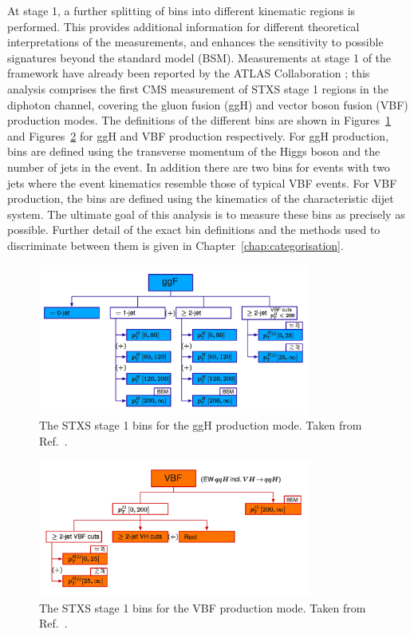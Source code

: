 At stage 1, a further splitting of bins into different kinematic regions is performed.
This provides additional information for different theoretical interpretations of the measurements, 
and enhances the sensitivity to possible signatures beyond the standard model (BSM).
Measurements at stage 1 of the framework have already been reported by the ATLAS Collaboration \cite{ATLAS_Hgg36,ATLAS_Hgg80,ATLASstage0_ZZ}; 
this analysis comprises the first CMS measurement of STXS stage 1 regions in the diphoton channel, 
covering the gluon fusion (ggH) and vector boson fusion (VBF) production modes.
The definitions of the different bins are shown in 
Figures~\ref{fig:theory_stage1ggH} and Figures~\ref{fig:theory_stage1VBF} 
for ggH and VBF production respectively.
For ggH production, bins are defined using the transverse momentum of the Higgs boson
and the number of jets in the event. 
In addition there are two bins for events with two jets where the event kinematics
resemble those of typical VBF events.
For VBF production, the bins are defined using the kinematics 
of the characteristic dijet system.
The ultimate goal of this analysis is to measure these bins as precisely as possible.
Further detail of the exact bin definitions 
and the methods used to discriminate between them is given in Chapter~\ref{chap:categorisation}.

\begin{figure}[hptb]
\centering
\includegraphics[width=0.8\textwidth]{Figures/Theory/stage1ggH.png}
\caption{
  The STXS stage 1 bins for the ggH production mode.
  Taken from Ref.~\cite{YR4}.
}
\label{fig:theory_stage1ggH}
\end{figure}

\begin{figure}[hptb]
\centering
\includegraphics[width=0.8\textwidth]{Figures/Theory/stage1VBF.png}
\caption{
  The STXS stage 1 bins for the VBF production mode.
  Taken from Ref.~\cite{YR4}.
}
\label{fig:theory_stage1VBF}
\end{figure}
